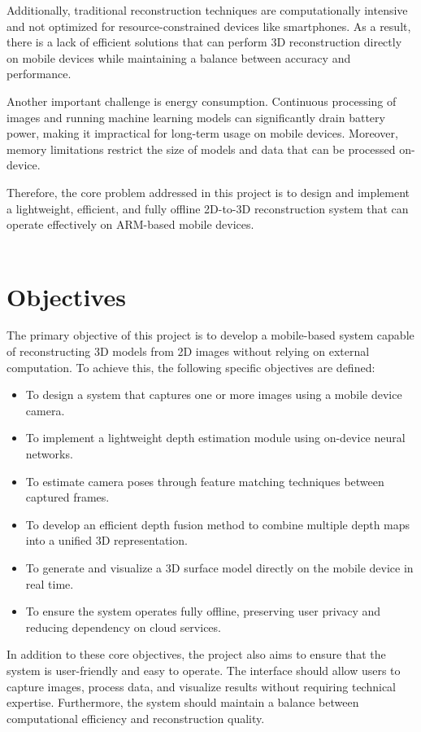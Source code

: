 Additionally, traditional reconstruction techniques are computationally intensive and not optimized for resource-constrained devices like smartphones. As a result, there is a lack of efficient solutions that can perform 3D reconstruction directly on mobile devices while maintaining a balance between accuracy and performance.

Another important challenge is energy consumption. Continuous processing of images and running machine learning models can significantly drain battery power, making it impractical for long-term usage on mobile devices. Moreover, memory limitations restrict the size of models and data that can be processed on-device.

Therefore, the core problem addressed in this project is to design and implement a lightweight, efficient, and fully offline 2D-to-3D reconstruction system that can operate effectively on ARM-based mobile devices. \\ \\

\section{Objectives}

The primary objective of this project is to develop a mobile-based system capable of reconstructing 3D models from 2D images without relying on external computation. To achieve this, the following specific objectives are defined:

\begin{itemize}
    \item To design a system that captures one or more images using a mobile device camera.
    \item To implement a lightweight depth estimation module using on-device neural networks.
    \item To estimate camera poses through feature matching techniques between captured frames.
    \item To develop an efficient depth fusion method to combine multiple depth maps into a unified 3D representation.
    \item To generate and visualize a 3D surface model directly on the mobile device in real time.
    \item To ensure the system operates fully offline, preserving user privacy and reducing dependency on cloud services.
\end{itemize}

In addition to these core objectives, the project also aims to ensure that the system is user-friendly and easy to operate. The interface should allow users to capture images, process data, and visualize results without requiring technical expertise. Furthermore, the system should maintain a balance between computational efficiency and reconstruction quality.

